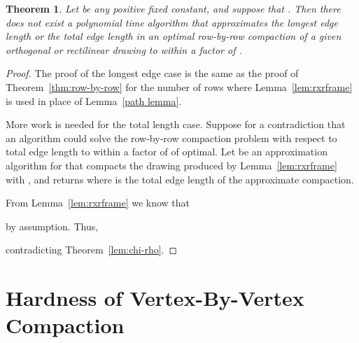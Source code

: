 \documentclass[12pt]{article}
\newtheorem{theorem}{Theorem}
\theoremstyle{definitions}
\begin{document}
\begin{theorem}
\label{thm:row-by-row-edgeSum}
Let  be any positive fixed constant, and suppose that
.
Then there does not exist a polynomial time algorithm that
approximates the longest edge length or the total edge length in an optimal row-by-row compaction of a given orthogonal or rectilinear drawing  to within a factor of . 
\end{theorem}
\begin{proof}
The proof of the longest edge case is the same as the proof of Theorem~\ref{thm:row-by-row} for the number of rows where Lemma~\ref{lem:rxrframe} is used in place of Lemma~\ref{path lemma}.

More work is needed for the total length case. Suppose for a contradiction that an algorithm
 could solve the row-by-row compaction problem with respect to total
edge length to within a factor of  of optimal. Let
 be an approximation algorithm for  that compacts the drawing produced by Lemma~\ref{lem:rxrframe} with , and returns  where  is the total edge length of the approximate compaction.

From Lemma~\ref{lem:rxrframe} we know that

by assumption. Thus,

contradicting Theorem~\ref{lem:chi-rho}.
\end{proof}

\section{Hardness of Vertex-By-Vertex Compaction}
\label{section:vertex-vertex}
\end{document}
